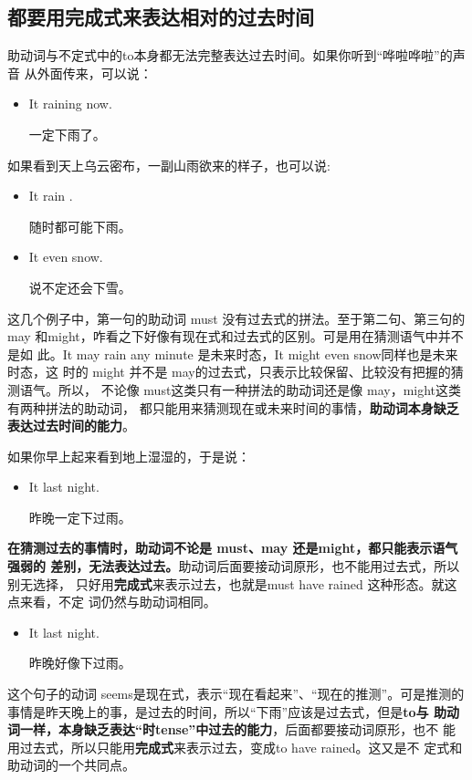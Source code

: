 \subsection{都要用完成式来表达相对的过去时间}

助动词与不定式中的to本身都无法完整表达过去时间。如果你听到“哗啦哗啦”的声音
从外面传来，可以说：
\begin{itemize}
\item It  raining now.

  一定下雨了。
\end{itemize}

如果看到天上乌云密布，一副山雨欲来的样子，也可以说:
\begin{itemize}
\item It  rain .

  随时都可能下雨。
\item It  even snow.

  说不定还会下雪。
\end{itemize}

这几个例子中，第一句的助动词 must 没有过去式的拼法。至于第二句、第三句的may
和might，咋看之下好像有现在式和过去式的区别。可是用在猜测语气中并不是如
此。It may rain any minute 是未来时态，It might even snow同样也是未来时态，这
时的 might 并不是 may的过去式，只表示比较保留、比较没有把握的猜测语气。所以，
不论像 must这类只有一种拼法的助动词还是像 may，might这类有两种拼法的助动词，
都只能用来猜测现在或未来时间的事情，\textbf{助动词本身缺乏表达过去时间的能力}。

如果你早上起来看到地上湿湿的，于是说：

\begin{itemize}
\item  It  last night.

  昨晚一定下过雨。
\end{itemize}

\textbf{在猜测过去的事情时，助动词不论是 must、may 还是might，都只能表示语气强弱的
  差别，无法表达过去。}助动词后面要接动词原形，也不能用过去式，所以别无选择，
只好用\textbf{完成式}来表示过去，也就是must have rained 这种形态。就这点来看，不定
词仍然与助动词相同。

\begin{itemize}
\item  It  last night.

  昨晚好像下过雨。
\end{itemize}

这个句子的动词 seems是现在式，表示“现在看起来”、“现在的推测”。可是推测的
事情是昨天晚上的事，是过去的时间，所以“下雨”应该是过去式，但是\textbf{to与
  助动词一样，本身缺乏表达“时tense”中过去的能力}，后面都要接动词原形，也不
能用过去式，所以只能用\textbf{完成式}来表示过去，变成to have rained。这又是不
定式和助动词的一个共同点。

